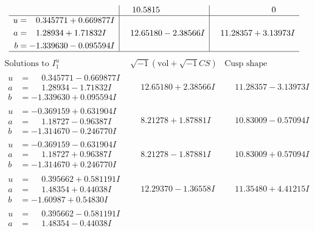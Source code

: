 \documentclass[1p]{elsarticle_modified}
\theoremstyle{definition}
\newcommand{\I}{\sqrt{-1}}
\begin{document}
$$\begin{array}{c|c|c}
 & \phantom{-}10.5815\phantom{ +0.000000I} & \phantom{-0.000000 } 0 \\ \hline\begin{aligned}
u &= \phantom{-}0.345771 + 0.669877 I \\
a &= \phantom{-}1.28934 + 1.71832 I \\
b &= -1.339630 - 0.095594 I\end{aligned}
 & \phantom{-}12.65180 - 2.38566 I & \phantom{-}11.28357 + 3.13973 I\\
 \hline 
 \end{array}$$\newpage$$\begin{array}{c|c|c}  
\text{Solutions to }I^u_{1}& \I (\text{vol} + \sqrt{-1}CS) & \text{Cusp shape}\\
 \hline 
\begin{aligned}
u &= \phantom{-}0.345771 - 0.669877 I \\
a &= \phantom{-}1.28934 - 1.71832 I \\
b &= -1.339630 + 0.095594 I\end{aligned}
 & \phantom{-}12.65180 + 2.38566 I & \phantom{-}11.28357 - 3.13973 I \\ \hline\begin{aligned}
u &= -0.369159 + 0.631904 I \\
a &= \phantom{-}1.18727 - 0.96387 I \\
b &= -1.314670 - 0.246770 I\end{aligned}
 & \phantom{-}8.21278 + 1.87881 I & \phantom{-}10.83009 - 0.57094 I \\ \hline\begin{aligned}
u &= -0.369159 - 0.631904 I \\
a &= \phantom{-}1.18727 + 0.96387 I \\
b &= -1.314670 + 0.246770 I\end{aligned}
 & \phantom{-}8.21278 - 1.87881 I & \phantom{-}10.83009 + 0.57094 I \\ \hline\begin{aligned}
u &= \phantom{-}0.395662 + 0.581191 I \\
a &= \phantom{-}1.48354 + 0.44038 I \\
b &= -1.60987 + 0.54830 I\end{aligned}
 & \phantom{-}12.29370 - 1.36558 I & \phantom{-}11.35480 + 4.41215 I \\ \hline\begin{aligned}
u &= \phantom{-}0.395662 - 0.581191 I \\
a &= \phantom{-}1.48354 - 0.44038 I \\

\end{aligned}
\end{array}$$
\end{document}

